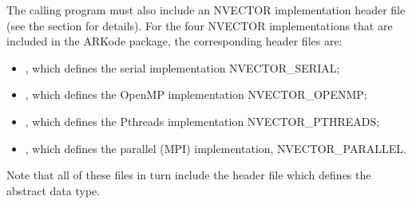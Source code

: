 \documentclass[letterpaper,10pt,english]{sphinxmanual}
\begin{document}
The calling program must also include an NVECTOR implementation
header file (see the section {\hyperref[nvectors/index:nvectors]{\emph{}}} for details).  For the four
NVECTOR implementations that are included in the ARKode package, the
corresponding header files are:
\begin{itemize}
\item {} 
, which defines the serial implementation
NVECTOR\_SERIAL;

\item {} 
, which defines the OpenMP implementation
NVECTOR\_OPENMP;

\item {} 
, which defines the Pthreads implementation
NVECTOR\_PTHREADS;

\item {} 
, which defines the parallel (MPI)
implementation, NVECTOR\_PARALLEL.

\end{itemize}

Note that all of these files in turn include the header file
 which defines the abstract  data
type.
\end{document}
